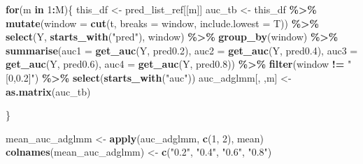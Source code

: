 \documentclass[
]{article}
\newenvironment{Shaded}{\begin{snugshade}}{\end{snugshade}}
\newcommand{\AttributeTok}[1]{\textcolor[rgb]{0.13,0.29,0.53}{#1}}
\newcommand{\ControlFlowTok}[1]{\textcolor[rgb]{0.13,0.29,0.53}{\textbf{#1}}}
\newcommand{\DecValTok}[1]{\textcolor[rgb]{0.00,0.00,0.81}{#1}}
\newcommand{\FloatTok}[1]{\textcolor[rgb]{0.00,0.00,0.81}{#1}}
\newcommand{\FunctionTok}[1]{\textcolor[rgb]{0.13,0.29,0.53}{\textbf{#1}}}
\newcommand{\NormalTok}[1]{#1}
\newcommand{\OtherTok}[1]{\textcolor[rgb]{0.56,0.35,0.01}{#1}}
\newcommand{\SpecialCharTok}[1]{\textcolor[rgb]{0.81,0.36,0.00}{\textbf{#1}}}
\newcommand{\StringTok}[1]{\textcolor[rgb]{0.31,0.60,0.02}{#1}}
\begin{document}
\begin{Shaded}
\begin{Highlighting}[]
\ControlFlowTok{for}\NormalTok{(m }\ControlFlowTok{in} \DecValTok{1}\SpecialCharTok{:}\NormalTok{M)\{}
\NormalTok{  this\_df }\OtherTok{\textless{}{-}}\NormalTok{ pred\_list\_ref[[m]]}
\NormalTok{  auc\_tb }\OtherTok{\textless{}{-}}\NormalTok{ this\_df }\SpecialCharTok{\%\textgreater{}\%} 
    \FunctionTok{mutate}\NormalTok{(}\AttributeTok{window =} \FunctionTok{cut}\NormalTok{(t, }\AttributeTok{breaks =}\NormalTok{ window, }\AttributeTok{include.lowest =}\NormalTok{ T)) }\SpecialCharTok{\%\textgreater{}\%} 
    \FunctionTok{select}\NormalTok{(Y, }\FunctionTok{starts\_with}\NormalTok{(}\StringTok{"pred"}\NormalTok{), window) }\SpecialCharTok{\%\textgreater{}\%}
    \FunctionTok{group\_by}\NormalTok{(window) }\SpecialCharTok{\%\textgreater{}\%}
    \FunctionTok{summarise}\NormalTok{(}\AttributeTok{auc1 =} \FunctionTok{get\_auc}\NormalTok{(Y, pred0}\FloatTok{.2}\NormalTok{),}
              \AttributeTok{auc2 =} \FunctionTok{get\_auc}\NormalTok{(Y, pred0}\FloatTok{.4}\NormalTok{),}
              \AttributeTok{auc3 =} \FunctionTok{get\_auc}\NormalTok{(Y, pred0}\FloatTok{.6}\NormalTok{),}
              \AttributeTok{auc4 =} \FunctionTok{get\_auc}\NormalTok{(Y, pred0}\FloatTok{.8}\NormalTok{)) }\SpecialCharTok{\%\textgreater{}\%}
    \FunctionTok{filter}\NormalTok{(window }\SpecialCharTok{!=} \StringTok{"[0,0.2]"}\NormalTok{) }\SpecialCharTok{\%\textgreater{}\%} 
    \FunctionTok{select}\NormalTok{(}\FunctionTok{starts\_with}\NormalTok{(}\StringTok{"auc"}\NormalTok{))}
\NormalTok{  auc\_adglmm[, ,m] }\OtherTok{\textless{}{-}} \FunctionTok{as.matrix}\NormalTok{(auc\_tb)}

\NormalTok{\}}


\NormalTok{mean\_auc\_adglmm }\OtherTok{\textless{}{-}} \FunctionTok{apply}\NormalTok{(auc\_adglmm, }\FunctionTok{c}\NormalTok{(}\DecValTok{1}\NormalTok{, }\DecValTok{2}\NormalTok{), mean)}
\FunctionTok{colnames}\NormalTok{(mean\_auc\_adglmm) }\OtherTok{\textless{}{-}} \FunctionTok{c}\NormalTok{(}\StringTok{"0.2"}\NormalTok{, }\StringTok{"0.4"}\NormalTok{, }\StringTok{"0.6"}\NormalTok{, }\StringTok{"0.8"}\NormalTok{)}
\end{Highlighting}
\end{Shaded}
\end{document}
